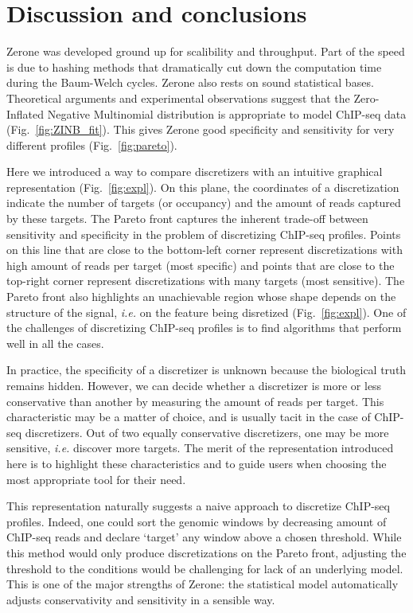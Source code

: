 \documentclass{bioinfo}
\begin{document}
\section{Discussion and conclusions}
Zerone was developed ground up for scalibility and throughput.
Part of the speed is due to hashing methods that dramatically
cut down the computation time during the Baum-Welch cycles. Zerone
also rests on sound statistical bases. Theoretical arguments and
experimental observations suggest that the Zero-Inflated Negative
Multinomial distribution is appropriate to model ChIP-seq data
(Fig.~\ref{fig:ZINB_fit}). This gives Zerone good specificity
and sensitivity for very different profiles (Fig.~\ref{fig:pareto}).

Here we introduced a way to compare discretizers with an intuitive
graphical representation (Fig.~\ref{fig:expl}). On this plane,
the coordinates of a discretization indicate the number of targets
(or occupancy) and the amount of reads captured by these targets.
The Pareto front captures the inherent trade-off between sensitivity
and specificity in the problem of discretizing ChIP-seq profiles.
Points on this line that are close to the bottom-left corner represent
discretizations with high amount of reads per target (most specific)
and points that are close to the top-right corner represent
discretizations with many targets (most sensitive). The Pareto front
also highlights an unachievable region whose shape depends on the
structure of the signal, \textit{i.e.} on the feature being disretized
(Fig.~\ref{fig:expl}). One of the challenges of discretizing ChIP-seq
profiles is to find algorithms that perform well in all the cases.

In practice, the specificity of a discretizer is unknown because
the biological truth remains hidden. However, we can decide whether
a discretizer is more or less conservative than another by measuring
the amount of reads per target. This characteristic may be a matter of
choice, and is usually tacit in the case of ChIP-seq discretizers.
Out of two equally conservative discretizers, one may be more sensitive,
\textit{i.e.} discover more targets. The merit of the representation
introduced here is to highlight these characteristics and to guide users
when choosing the most appropriate tool for their need.

This representation naturally suggests a naive approach to discretize
ChIP-seq profiles. Indeed, one could sort the genomic windows by
decreasing amount of ChIP-seq reads and declare `target' any window
above a chosen threshold. While this method would only produce
discretizations on the Pareto front, adjusting the threshold to the
conditions would be challenging for lack of an underlying model.
This is one of the major strengths of Zerone: the statistical model
automatically adjusts conservativity and sensitivity in a sensible way.
\end{document}
